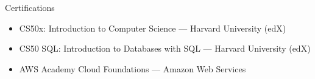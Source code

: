 \documentclass{resume} %
\begin{document}
\begin{rSection}{Certifications}
\begin{itemize}
  \item CS50x: Introduction to Computer Science --- Harvard University (edX)
  \item CS50 SQL: Introduction to Databases with SQL --- Harvard University (edX)
  \item AWS Academy Cloud Foundations --- Amazon Web Services
\end{itemize}
\end{rSection}
\end{document}
